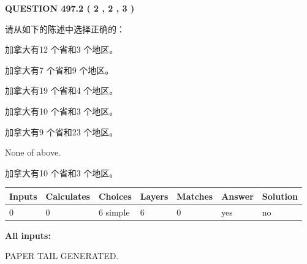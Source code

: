\documentclass{ctexart}
\begin{document}
   
  
\vspace{0.2in}
  
{\textbf{\Large{QUESTION
497.2 
 ( 2 , 2 , 3 )
}}}
  
  
请从如下的陈述中选择正确的：
 
 
加拿大有12 个省和3 个地区。
 
 
加拿大有7 个省和9 个地区。
 
 
加拿大有19 个省和4 个地区。
 
 
加拿大有10 个省和3 个地区。
 
 
加拿大有9 个省和23 个地区。
 
 
 None of above.
 
 
\noindent{}
 
 
加拿大有10 个省和3 个地区。
 
 
\noindent{}
 
 
   
   
   
   
\noindent\begin{tabular}{|l|l|l|l|l|l|l|}
 \hline
Inputs & Calculates & Choices & Layers & Matches & Answer & Solution \\ \hline
 0  & 
 0  & 
 6
  simple  
  & 
 6  & 
 0  & 
  yes & 
  no 
  \\ \hline
 \end{tabular}
   
   
   
   
\noindent{}
   
   
   
   
\noindent\vspace{0.1in}\hspace{-0.08in} {\textbf{\Large{All inputs: }}}
   
   
   
   
   
   
 \vspace{0.2in}
 
   
   
\vspace{2.0in} PAPER TAIL GENERATED.
   
\end{document}
